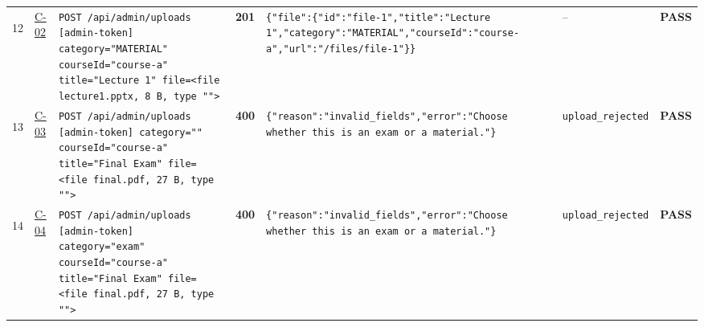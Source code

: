 \documentclass[10pt,a4paper]{article}
\begin{document}
\begin{landscape}
\begin{longtable}{@{}P{0.6cm}P{0.9cm}P{8.5cm}P{1.0cm}P{6.2cm}P{4.2cm}P{1.1cm}@{}}
\hypertarget{call12}{12} & \hyperlink{test-C-02}{C-02} & \texttt{POST /\allowbreak{}api/\allowbreak{}admin/\allowbreak{}uploads [admin-\allowbreak{}token] category=\allowbreak{}"\allowbreak{}MATERIAL"\allowbreak{} courseId=\allowbreak{}"\allowbreak{}course-\allowbreak{}a"\allowbreak{} title=\allowbreak{}"\allowbreak{}Lecture 1"\allowbreak{} file=\allowbreak{}<file lecture1.\allowbreak{}pptx,\allowbreak{} 8 B,\allowbreak{} type "\allowbreak{}"\allowbreak{}>} & \textcolor{passgreen}{\textbf{201}} & \texttt{\{"\allowbreak{}file"\allowbreak{}:\allowbreak{}\{"\allowbreak{}id"\allowbreak{}:\allowbreak{}"\allowbreak{}file-\allowbreak{}1"\allowbreak{},\allowbreak{}"\allowbreak{}title"\allowbreak{}:\allowbreak{}"\allowbreak{}Lecture 1"\allowbreak{},\allowbreak{}"\allowbreak{}category"\allowbreak{}:\allowbreak{}"\allowbreak{}MATERIAL"\allowbreak{},\allowbreak{}"\allowbreak{}courseId"\allowbreak{}:\allowbreak{}"\allowbreak{}course-\allowbreak{}a"\allowbreak{},\allowbreak{}"\allowbreak{}url"\allowbreak{}:\allowbreak{}"\allowbreak{}/\allowbreak{}files/\allowbreak{}file-\allowbreak{}1"\allowbreak{}\}\}} & -- & \textcolor{passgreen}{\textbf{PASS}} \\
\hypertarget{call13}{13} & \hyperlink{test-C-03}{C-03} & \texttt{POST /\allowbreak{}api/\allowbreak{}admin/\allowbreak{}uploads [admin-\allowbreak{}token] category=\allowbreak{}"\allowbreak{}"\allowbreak{} courseId=\allowbreak{}"\allowbreak{}course-\allowbreak{}a"\allowbreak{} title=\allowbreak{}"\allowbreak{}Final Exam"\allowbreak{} file=\allowbreak{}<file final.\allowbreak{}pdf,\allowbreak{} 27 B,\allowbreak{} type "\allowbreak{}"\allowbreak{}>} & \textcolor{warnamber}{\textbf{400}} & \texttt{\{"\allowbreak{}reason"\allowbreak{}:\allowbreak{}"\allowbreak{}invalid\_\allowbreak{}fields"\allowbreak{},\allowbreak{}"\allowbreak{}error"\allowbreak{}:\allowbreak{}"\allowbreak{}Choose whether this is an exam or a material.\allowbreak{}"\allowbreak{}\}} & \texttt{upload\_\allowbreak{}rejected} & \textcolor{passgreen}{\textbf{PASS}} \\
\hypertarget{call14}{14} & \hyperlink{test-C-04}{C-04} & \texttt{POST /\allowbreak{}api/\allowbreak{}admin/\allowbreak{}uploads [admin-\allowbreak{}token] category=\allowbreak{}"\allowbreak{}exam"\allowbreak{} courseId=\allowbreak{}"\allowbreak{}course-\allowbreak{}a"\allowbreak{} title=\allowbreak{}"\allowbreak{}Final Exam"\allowbreak{} file=\allowbreak{}<file final.\allowbreak{}pdf,\allowbreak{} 27 B,\allowbreak{} type "\allowbreak{}"\allowbreak{}>} & \textcolor{warnamber}{\textbf{400}} & \texttt{\{"\allowbreak{}reason"\allowbreak{}:\allowbreak{}"\allowbreak{}invalid\_\allowbreak{}fields"\allowbreak{},\allowbreak{}"\allowbreak{}error"\allowbreak{}:\allowbreak{}"\allowbreak{}Choose whether this is an exam or a material.\allowbreak{}"\allowbreak{}\}} & \texttt{upload\_\allowbreak{}rejected} & \textcolor{passgreen}{\textbf{PASS}} \\

\end{longtable}
\end{landscape}
\end{document}
